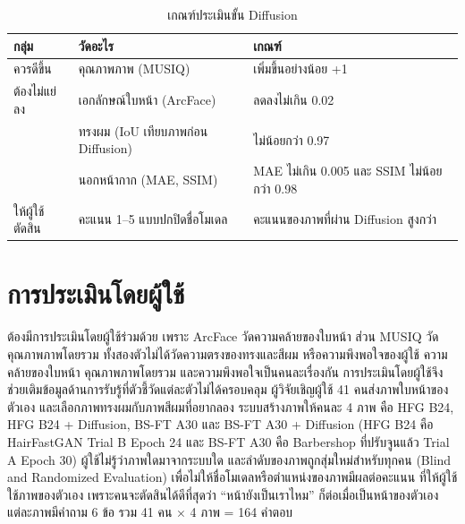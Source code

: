 \begin{table}[!htbp]
\centering
\caption{เกณฑ์ประเมินขั้น Diffusion}
\label{tab:diff_criteria}
\begin{tabular}{|L{2.6cm}|L{5.2cm}|L{5.2cm}|}
\hline
\textbf{กลุ่ม} & \textbf{วัดอะไร} & \textbf{เกณฑ์} \\ \hline
ควรดีขึ้น & คุณภาพภาพ (MUSIQ) & เพิ่มขึ้นอย่างน้อย +1 \\ \hline
ต้องไม่แย่ลง & เอกลักษณ์ใบหน้า (ArcFace) & ลดลงไม่เกิน 0.02 \\ 
 & ทรงผม (IoU เทียบภาพก่อน Diffusion) & ไม่น้อยกว่า 0.97 \\ 
 & นอกหน้ากาก (MAE, SSIM) & MAE ไม่เกิน 0.005 และ SSIM ไม่น้อยกว่า 0.98 \\ \hline
ให้ผู้ใช้ตัดสิน & คะแนน 1--5 แบบปกปิดชื่อโมเดล & คะแนนของภาพที่ผ่าน Diffusion สูงกว่า \\ \hline
\end{tabular}
\par\vspace{3pt}{\footnotesize\raggedright หมายเหตุ: MUSIQ = Multi-scale Image Quality Transformer (คะแนนคุณภาพภาพ), ArcFace = โมเดลจดจำใบหน้าที่ใช้วัดความเหมือนของใบหน้า, IoU = Intersection over Union (สัดส่วนพื้นที่ผมที่ทับกัน), MAE = Mean Absolute Error (ค่าความคลาดเคลื่อนสัมบูรณ์เฉลี่ย), SSIM = Structural Similarity Index (ดัชนีความคล้ายเชิงโครงสร้าง)\par}

\end{table}

\section{การประเมินโดยผู้ใช้}
\label{sec:subjective_method}

ต้องมีการประเมินโดยผู้ใช้ร่วมด้วย เพราะ ArcFace วัดความคล้ายของใบหน้า ส่วน MUSIQ วัดคุณภาพภาพโดยรวม
ทั้งสองตัวไม่ได้วัดความตรงของทรงและสีผม หรือความพึงพอใจของผู้ใช้
ความคล้ายของใบหน้า คุณภาพภาพโดยรวม และความพึงพอใจเป็นคนละเรื่องกัน
การประเมินโดยผู้ใช้จึงช่วยเติมข้อมูลด้านการรับรู้ที่ตัวชี้วัดแต่ละตัวไม่ได้ครอบคลุม
ผู้วิจัยเชิญผู้ใช้ 41 คนส่งภาพใบหน้าของตัวเอง และเลือกภาพทรงผมกับภาพสีผมที่อยากลอง
ระบบสร้างภาพให้คนละ 4 ภาพ คือ HFG B24, HFG B24 + Diffusion, BS-FT A30 และ BS-FT A30 + Diffusion
(HFG B24 คือ HairFastGAN Trial B Epoch 24 และ BS-FT A30 คือ Barbershop ที่ปรับจูนแล้ว Trial A Epoch 30)
ผู้ใช้ไม่รู้ว่าภาพใดมาจากระบบใด และลำดับของภาพถูกสุ่มใหม่สำหรับทุกคน (Blind and Randomized Evaluation)
เพื่อไม่ให้ชื่อโมเดลหรือตำแหน่งของภาพมีผลต่อคะแนน
ที่ให้ผู้ใช้ใช้ภาพของตัวเอง เพราะคนจะตัดสินได้ดีที่สุดว่า ``หน้ายังเป็นเราไหม'' ก็ต่อเมื่อเป็นหน้าของตัวเอง
แต่ละภาพมีคำถาม 6 ข้อ รวม 41 คน $\times$ 4 ภาพ = 164 คำตอบ

